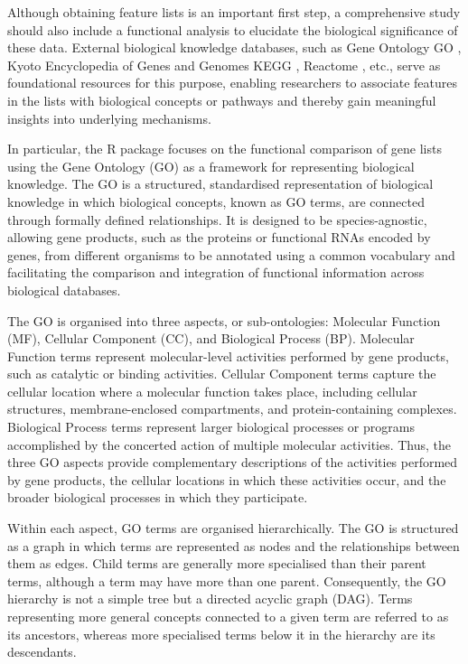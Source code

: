 Although obtaining feature lists is an important first step, a comprehensive study should also include a functional analysis to elucidate the biological significance of these data. External biological knowledge databases, such as Gene Ontology GO \citep{ashburner2000gene, gene2023gene}, Kyoto Encyclopedia of Genes and Genomes KEGG \citep{kanehisa2000kegg, kanehisa2025kegg}, Reactome \citep{jassal2020reactome}, etc., serve as foundational resources for this purpose, enabling researchers to associate features in the lists with biological concepts or pathways and thereby gain meaningful insights into underlying mechanisms.

In particular, the  R package focuses on the functional comparison of gene lists using the Gene Ontology (GO) as a framework for representing biological knowledge. The GO is a structured, standardised representation of biological knowledge in which biological concepts, known as GO terms, are connected through formally defined relationships. It is designed to be species-agnostic, allowing gene products, such as the proteins or functional RNAs encoded by genes, from different organisms to be annotated using a common vocabulary and facilitating the comparison and integration of functional information across biological databases.

The GO is organised into three aspects, or sub-ontologies: Molecular Function (MF), Cellular Component (CC), and Biological Process (BP). Molecular Function terms represent molecular-level activities performed by gene products, such as catalytic or binding activities. Cellular Component terms capture the cellular location where a molecular function takes place, including cellular structures, membrane-enclosed compartments, and protein-containing complexes. Biological Process terms represent larger biological processes or programs accomplished by the concerted action of multiple molecular activities. Thus, the three GO aspects provide complementary descriptions of the activities performed by gene products, the cellular locations in which these activities occur, and the broader biological processes in which they participate.

Within each aspect, GO terms are organised hierarchically. The GO is structured as a graph in which terms are represented as nodes and the relationships between them as edges. Child terms are generally more specialised than their parent terms, although a term may have more than one parent. Consequently, the GO hierarchy is not a simple tree but a directed acyclic graph (DAG). Terms representing more general concepts connected to a given term are referred to as its ancestors, whereas more specialised terms below it in the hierarchy are its descendants.

